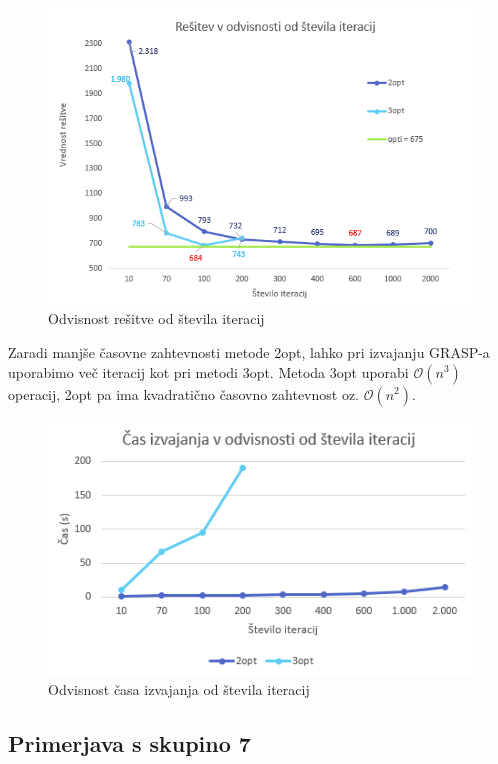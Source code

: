 \documentclass[12pt,a4paper]{amsart}
\theoremstyle{definition} %
\theoremstyle{plain} %
\begin{document}
\begin{figure}[H]
\caption{Odvisnost rešitve od števila iteracij}
\centering
\includegraphics[scale =0.8]{resitev_iteracije}
\end{figure}

Zaradi manjše časovne zahtevnosti metode 2opt, lahko pri izvajanju GRASP-a uporabimo več iteracij kot pri metodi 3opt. Metoda 3opt uporabi $\mathcal{O}(n^3)$ operacij, 2opt pa ima kvadratično časovno zahtevnost oz. $\mathcal{O}(n^2)$.

\begin{figure}[H]
\caption{Odvisnost časa izvajanja od števila iteracij}
\centering
\includegraphics[scale =0.8]{cas_izvajanja}
\end{figure}

\subsection{Primerjava s skupino 7} ~\\
\end{document}
